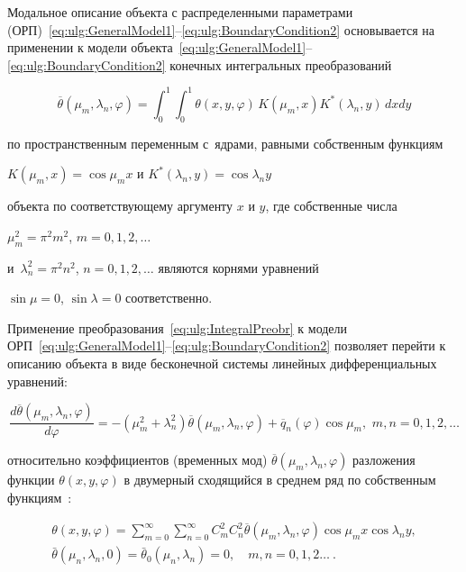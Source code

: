 Модальное описание объекта с распределенными параметрами (ОРП)~\eqref{eq:ulg:GeneralModel1}--\eqref{eq:ulg:BoundaryCondition2} основывается на применении к модели объекта~\eqref{eq:ulg:GeneralModel1}--\eqref{eq:ulg:BoundaryCondition2} конечных интегральных преобразований~\cite{ulg:bib:Koshlyakov_Gliner_Smirnov}

\begin{equation}

\label{eq:ulg:IntegralPreobr}

\overline \theta  (\mu _m,\lambda _n,\varphi ) = \int _0^1 {\int _0^1 {\theta (x,y,\varphi )\,} } K(\mu _m,x) {K^*}(\lambda _n,y)\,dxdy 

\end{equation}

по пространственным переменным с~ядрами, равными собственным функциям  

$K(\mu _m,x) = \cos  \mu _m x $ и $K^*(\lambda _n,y) = \cos  \lambda _n y $  

объекта по соответствующему аргументу $x$  и $y$, где собственные числа  

$\mu _m^2 = {\pi ^2}{m^2}$, $m = 0, 1, 2, \dots$ 

и~$\lambda _n^2 = {\pi ^2}{n^2}$, $n = 0, 1, 2, \dots$  являются корнями уравнений 

$\sin \mu  = 0$, $\sin \lambda  = 0$  соответственно. 

Применение преобразования~\eqref{eq:ulg:IntegralPreobr} к модели ОРП~\eqref{eq:ulg:GeneralModel1}--\eqref{eq:ulg:BoundaryCondition2} позволяет перейти к описанию объекта в виде бесконечной системы линейных дифференциальных уравнений:

\begin{equation}\label{eq:ulg:System_LinearDifEq}

\frac{d\overline \theta  (\mu _m,\lambda _n,\varphi )}{d\varphi } =  - ( \mu _m^2 + \lambda _n^2 )\overline \theta  (\mu _m,\lambda _n,\varphi ) + {\overline q _n}(\varphi )\cos \mu _m ,\,\,m,n = 0, 1, 2, \dots

\end{equation}

относительно коэффициентов (временных мод) $\overline \theta  (\mu _m,\lambda _n,\varphi ) $ разложения функции $\theta (x,y,\varphi ) $ в двумерный сходящийся в среднем ряд по собственным функциям~\cite{ulg:bib:Koshlyakov_Gliner_Smirnov}:

\begin{gather}\label{eq:ulg:Infinite_Serial_Temperature}

\theta (x,y,\varphi ) = \sum\limits_{m = 0}^\infty  {\sum\limits_{n = 0}^\infty  {C_m^2C_n^2\overline \theta  (\mu _m,\lambda _n,\varphi )} } \cos \mu _m x \cos \lambda _n y,

\\

\bar \theta (\mu _n,\lambda _n,0) = {\bar \theta _0}(\mu _n,\lambda _n) = 0,\quad m, n = 0, 1, 2\dots\ .

\end{gather}

